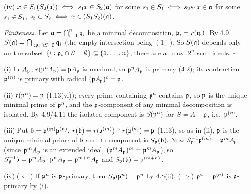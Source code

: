 \documentclass[11pt]{article}
\begin{document}
(iv) $x\in S_1(S_2(\mathfrak a))\iff s_1x\in S_2(\mathfrak a)$ for some $s_1\in S_1\iff s_2s_1x\in\mathfrak a$ for some $s_1\in S_1$, $s_2\in S_2\iff x\in(S_1S_2)(\mathfrak a)$.

\emph{Finiteness.} Let $\mathfrak a=\bigcap_{i=1}^n\mathfrak q_i$ be a minimal decomposition, $\mathfrak p_i=r(\mathfrak q_i)$. By 4.9, $S(\mathfrak a)=\bigcap_{i:\mathfrak p_i\cap S=\emptyset}\mathfrak q_i$ (the empty intersection being $(1)$). So $S(\mathfrak a)$ depends only on the subset $\{i:\mathfrak p_i\cap S=\emptyset\}\subseteq\{1,\dots,n\}$; there are at most $2^n$ such ideals. \hfill$\square$

\pf
(i) In $A_\mathfrak p$, $r(\mathfrak p^nA_\mathfrak p)=\mathfrak p A_\mathfrak p$ is maximal, so $\mathfrak p^nA_\mathfrak p$ is primary (4.2); its contraction $\mathfrak p^{(n)}$ is primary with radical $(\mathfrak p A_\mathfrak p)^c=\mathfrak p$.

(ii) $r(\mathfrak p^n)=\mathfrak p$ (1.13(vi)); every prime containing $\mathfrak p^n$ contains $\mathfrak p$, so $\mathfrak p$ is the unique minimal prime of $\mathfrak p^n$, and the $\mathfrak p$-component of any minimal decomposition is isolated. By 4.9/4.11 the isolated component is $S(\mathfrak p^n)$ for $S=A-\mathfrak p$, i.e.\ $\mathfrak p^{(n)}$.

(iii) Put $\mathfrak b=\mathfrak p^{(m)}\mathfrak p^{(n)}$. $r(\mathfrak b)=r(\mathfrak p^{(m)})\cap r(\mathfrak p^{(n)})=\mathfrak p$ (1.13), so as in (ii), $\mathfrak p$ is the unique minimal prime of $\mathfrak b$ and its component is $S_\mathfrak p(\mathfrak b)$. Now $S_\mathfrak p^{-1}\mathfrak p^{(m)}=\mathfrak p^mA_\mathfrak p$ (since $\mathfrak p^mA_\mathfrak p$ is an extended ideal, $(\mathfrak p^mA_\mathfrak p)^{ce}=\mathfrak p^mA_\mathfrak p$), so $S_\mathfrak p^{-1}\mathfrak b=\mathfrak p^mA_\mathfrak p\cdot\mathfrak p^nA_\mathfrak p=\mathfrak p^{m+n}A_\mathfrak p$ and $S_\mathfrak p(\mathfrak b)=\mathfrak p^{(m+n)}$.

(iv) ($\Leftarrow$) If $\mathfrak p^n$ is $\mathfrak p$-primary, then $S_\mathfrak p(\mathfrak p^n)=\mathfrak p^n$ by 4.8(ii). ($\Rightarrow$) $\mathfrak p^n=\mathfrak p^{(n)}$ is $\mathfrak p$-primary by (i). \hfill$\square$
\end{document}
